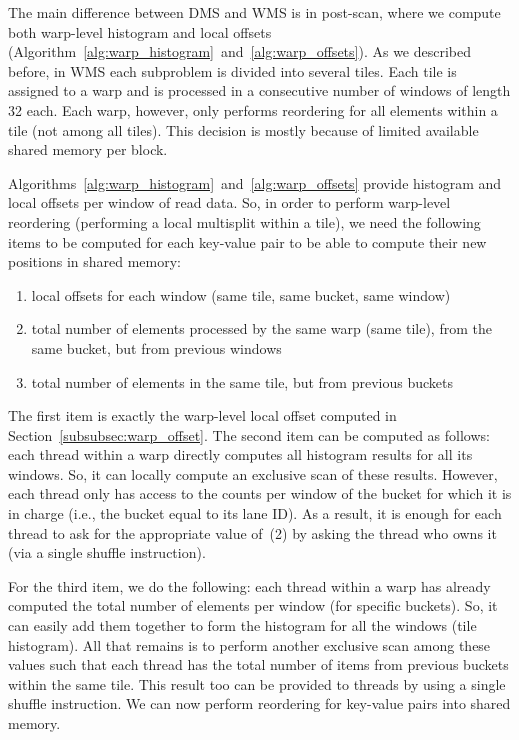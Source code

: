 The main difference between DMS and WMS is in post-scan, where we compute both warp-level histogram and local offsets (Algorithm~\ref{alg:warp_histogram}~and~\ref{alg:warp_offsets}).
As we described before, in WMS each subproblem is divided into several tiles. Each tile is assigned to a warp and is processed in a consecutive number of windows of length 32 each.
Each warp, however, only performs reordering for all elements within a tile (not among all tiles).
This decision is mostly because of limited available shared memory per block.

Algorithms~\ref{alg:warp_histogram}~and~\ref{alg:warp_offsets} provide histogram and local offsets per window of read data. So, in order to perform warp-level reordering (performing a local multisplit within a tile), we need the following items to be computed for each key-value pair to be able to compute their new positions in shared memory:
\begin{enumerate}
        \item local offsets for each window (same tile, same bucket, same window)
        \item total number of elements processed by the same warp (same tile), from the same bucket, but from previous windows
        \item total number of elements in the same tile, but from previous buckets
\end{enumerate}
The first item is exactly the warp-level local offset computed in Section~\ref{subsubsec:warp_offset}.
The second item can be computed as follows: each thread within a warp directly computes all histogram results for all its windows. So, it can locally compute an exclusive scan of these results. However, each thread only has access to the counts per window of the  bucket for which it is in charge (i.e., the bucket equal to its lane ID). As a result, it is enough for each thread to ask for the appropriate value of~(2) by asking the thread who owns it (via a single shuffle instruction).

For the third item, we do the following: each thread within a warp has already computed the total number of elements per window (for specific buckets). So, it can easily add them together to form the histogram for all the windows (tile histogram).
All that remains is to perform another exclusive scan among these values such that each thread has the total number of items from previous buckets within the same tile.
This result too can be provided to threads by using a single shuffle instruction.
We can now perform reordering for key-value pairs into shared memory.

